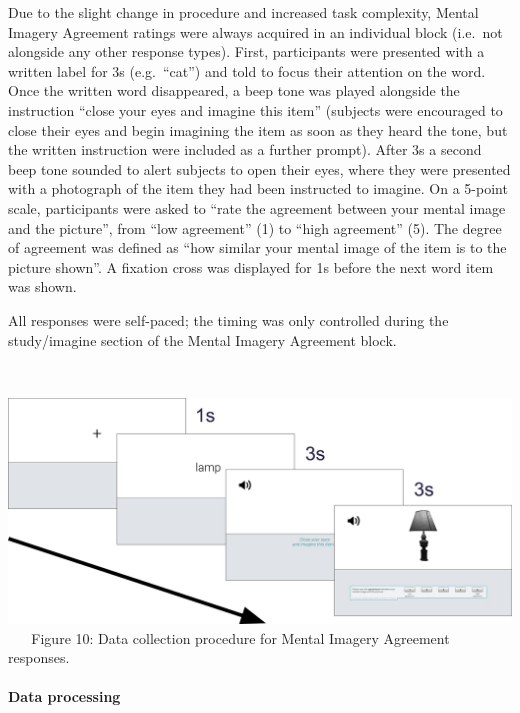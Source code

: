 \documentclass[
  11pt,
]{article}
\begin{document}
Due to the slight change in procedure and increased task complexity,
Mental Imagery Agreement ratings were always acquired in an individual
block (i.e.~not alongside any other response types). First, participants
were presented with a written label for 3s (e.g.~``cat'') and told to
focus their attention on the word. Once the written word disappeared, a
beep tone was played alongside the instruction ``close your eyes and
imagine this item'' (subjects were encouraged to close their eyes and
begin imagining the item as soon as they heard the tone, but the written
instruction were included as a further prompt). After 3s a second beep
tone sounded to alert subjects to open their eyes, where they were
presented with a photograph of the item they had been instructed to
imagine. On a 5-point scale, participants were asked to ``rate the
agreement between your mental image and the picture'', from ``low
agreement'' (1) to ``high agreement'' (5). The degree of agreement was
defined as ``how similar your mental image of the item is to the picture
shown''. A fixation cross was displayed for 1s before the next word item
was shown.

All responses were self-paced; the timing was only controlled during the
study/imagine section of the Mental Imagery Agreement block.

~ ~

\includegraphics[width=1\linewidth]{./resources/images/procedure} ~ ~
Figure 10: Data collection procedure for Mental Imagery Agreement
responses. ~ ~

\hypertarget{data-processing-1}{%
\paragraph{Data processing}\label{data-processing-1}}
\end{document}
